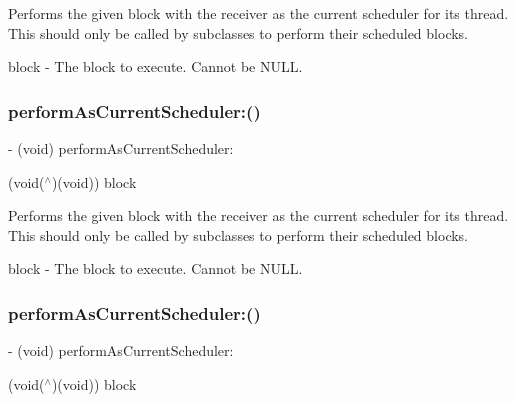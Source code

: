 Performs the given block with the receiver as the current scheduler for its thread. This should only be called by subclasses to perform their scheduled blocks.

block -\/ The block to execute. Cannot be N\+U\+LL. \mbox{\label{interface_r_a_c_scheduler_a2aaec93a6a9e3dbe316ee320a312ca2e}} 
\subsubsection{\texorpdfstring{perform\+As\+Current\+Scheduler\+:()}{performAsCurrentScheduler:()}\hspace{0.1cm}{\footnotesize\ttfamily [2/3]}}
{\footnotesize\ttfamily -\/ (void) perform\+As\+Current\+Scheduler\+: \begin{DoxyParamCaption}\item[{(void($^\wedge$)(void))}]{block }\end{DoxyParamCaption}\hspace{0.3cm}{\ttfamily [implementation]}}

Performs the given block with the receiver as the current scheduler for its thread. This should only be called by subclasses to perform their scheduled blocks.

block -\/ The block to execute. Cannot be N\+U\+LL. \mbox{\label{interface_r_a_c_scheduler_a2aaec93a6a9e3dbe316ee320a312ca2e}} 
\subsubsection{\texorpdfstring{perform\+As\+Current\+Scheduler\+:()}{performAsCurrentScheduler:()}\hspace{0.1cm}{\footnotesize\ttfamily [3/3]}}
{\footnotesize\ttfamily -\/ (void) perform\+As\+Current\+Scheduler\+: \begin{DoxyParamCaption}\item[{(void($^\wedge$)(void))}]{block }\end{DoxyParamCaption}\hspace{0.3cm}{\ttfamily [implementation]}}

